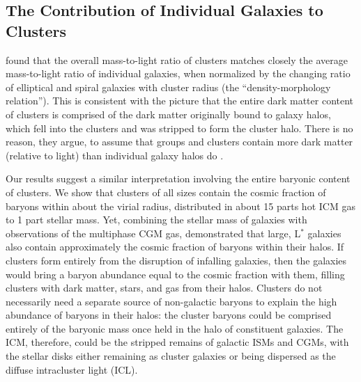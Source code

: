 \subsection{The Contribution of Individual Galaxies to Clusters}
\label{sec:Implications.Individual}

\citet{Bahcall2014} found that the overall mass-to-light ratio of
clusters matches closely the average mass-to-light ratio of individual
galaxies, when normalized by the changing ratio of elliptical and
spiral galaxies with cluster radius (the ``density-morphology
relation''). This is consistent with the picture that the entire dark
matter content of clusters is comprised of the dark matter originally
bound to galaxy halos, which fell into the clusters and was stripped
to form the cluster halo. There is no reason, they argue, to assume
that groups and clusters contain more dark matter (relative to light)
than individual galaxy halos do \cite[unlike as predicted by
  e.g.,][]{Ostriker1974, Guo2010}.

Our results suggest a similar interpretation involving the entire
baryonic content of clusters. We show that clusters of all sizes
contain the cosmic fraction of baryons within about the virial radius,
distributed in about 15 parts hot ICM gas to 1 part stellar mass. Yet,
combining the stellar mass of galaxies with observations of the
multiphase CGM gas, \citet{Werk2014} demonstrated that large, L$^*$
galaxies also contain approximately the cosmic fraction of baryons
within their halos. If clusters form entirely from the disruption of
infalling galaxies, then the galaxies would bring a baryon abundance
equal to the cosmic fraction with them, filling clusters with dark
matter, stars, and gas from their halos. Clusters do not necessarily
need a separate source of non-galactic baryons to explain the high
abundance of baryons in their halos: the cluster baryons could be
comprised entirely of the baryonic mass once held in the halo of
constituent galaxies. The ICM, therefore, could be the stripped
remains of galactic ISMs and CGMs, with the stellar disks either
remaining as cluster galaxies or being dispersed as the diffuse
intracluster light (ICL).

